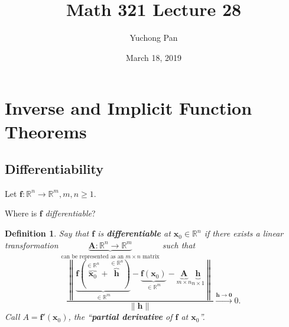 \documentclass[letterpaper, reqno,11pt]{article}
\newcommand{\RR}{\mathbb{R}}
\begin{document}
\title{Math 321 Lecture 28}
\author{Yuchong Pan}
\date{March 18, 2019}
\newtheorem{thm}{Theorem}
\newtheorem{defn}{Definition}
\newtheorem*{remark}{Remark}
\newtheorem{claim}{Claim}
\newtheorem{cor}{Corollary}
\newtheorem{lemma}{Lemma}
\newtheorem{prop}{Proposition}
\newtheorem{fact}{Fact}
\maketitle
%

\section{Inverse and Implicit Function Theorems}

\subsection{Differentiability}

Let $\mathbf f : \RR^n \to \RR^m, m, n \geq 1$.

 Where is $\mathbf f$ \emph{differentiable}?

\begin{defn}
  \normalfont Say that $\mathbf f$ is {\bf differentiable} at $\mathbf x_0 \in \RR^n$ if there exists a linear transformation $\underbrace{\mathbf A : \RR^n \to \RR^m}_\text{can be represented as an $m \times n$ matrix}$ such that
  \begin{equation} \label{eq:*} \tag{*}
    \frac{\left\lVert \underbrace{\mathbf f(\overbrace{\mathbf x_0}^{\in \RR^n} + \overbrace{\mathbf h}^{\in \RR^n})}_{\in \RR^m} - \underbrace{\mathbf f(\mathbf x_0)}_{\in \RR^m} - \underbrace{\mathbf A}_{m \times n} \underbrace{\mathbf h}_{n \times 1} \right\rVert}{\lVert \mathbf h \rVert} \xrightarrow{\mathbf h \to \mathbf 0} 0.
  \end{equation}
  Call $A = \mathbf f'(\mathbf x_0)$, the ``{\bf partial derivative} of $\mathbf f$ at $\mathbf x_0$''.
\end{defn}
\end{document}

